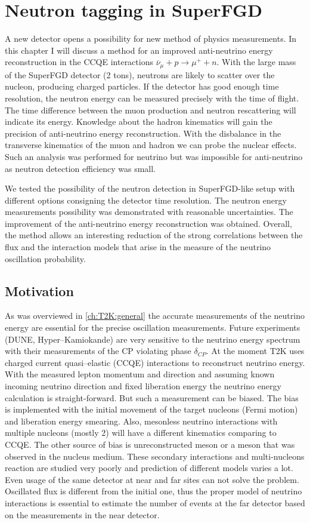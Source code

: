 \documentclass[main.tex]{subfiles}
\begin{document}
\chapter{Neutron tagging in SuperFGD}
\label{ch:up:neutron}
A new detector opens a possibility for new method of physics measurements. In this chapter I will discuss a method for an improved anti-neutrino energy reconstruction in the CCQE interactions $\overline{\nu}_\mu+p\to\mu^++n$. With the large mass of the SuperFGD detector (2 tons), neutrons are likely to scatter over the nucleon, producing charged particles. If the detector has good enough time resolution, the neutron energy can be measured precisely with the time of flight. The time difference between the muon production and neutron rescattering will indicate its energy. Knowledge about the hadron kinematics will gain the precision of anti-neutrino energy reconstruction. With the disbalance in the transverse kinematics of the muon and hadron we can probe the nuclear effects. Such an analysis was performed for neutrino but was impossible for anti-neutrino as neutron detection efficiency was small.

We tested the possibility of the neutron detection in SuperFGD-like setup with different options consigning the detector time resolution. The neutron energy measurements possibility was demonstrated with reasonable uncertainties. The improvement of the anti-neutrino energy reconstruction was obtained. Overall, the method allows an interesting reduction of the strong correlations between the flux and the interaction models that arise in the measure of the neutrino oscillation probability.

\section{Motivation}
As was overviewed in \autoref{ch:T2K:general} the accurate measurements of the neutrino energy are essential for the precise oscillation measurements. Future experiments (DUNE, Hyper--Kamiokande) are very sensitive to the neutrino energy spectrum with their measurements of the CP violating phase $\delta_{CP}$. At the moment T2K uses charged current quasi--elastic (CCQE) interactions to reconstruct neutrino energy. With the measured lepton momentum and direction and assuming known incoming neutrino direction and fixed liberation energy the neutrino energy calculation is straight-forward. But such a measurement can be biased.
The bias is implemented with the initial movement of the target nucleons (Fermi motion) and liberation energy smearing. Also, mesonless neutrino interactions with multiple nucleons (mostly 2) will have a different kinematics comparing to CCQE. The other source of bias is unreconstructed meson or a meson that was observed in the nucleus medium. These secondary interactions and multi-nucleons reaction are studied very poorly and prediction of different models varies a lot. Even usage of the same detector at near and far sites can not solve the problem. Oscillated flux is different from the initial one, thus the proper model of  neutrino interactions is essential to estimate the number of events at the far detector based on the measurements in the near detector.
\end{document}
